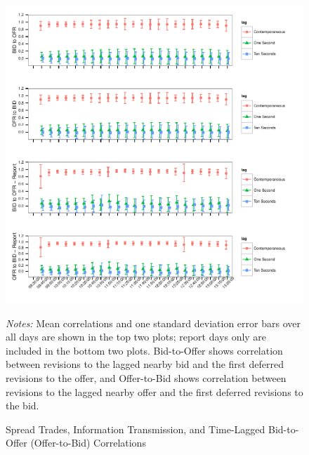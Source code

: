 \documentclass[review,12pt]{elsarticle}
\begin{document}
\begin{figure}[htbp]
\includegraphics[scale=0.95]{TablesFigures_files/figure-latex/unnamed-chunk-6-1.pdf}
{\footnotesize  \emph{Notes:} Mean correlations and one standard deviation error bars over all days
are shown in the top two plots; report days only are included in the
bottom two plots. Bid-to-Offer shows correlation between revisions to
the lagged nearby bid and the first deferred revisions to the offer, and
Offer-to-Bid shows correlation between revisions to the lagged nearby
offer and the first deferred revisions to the bid. \par}
\caption{Spread Trades, Information Transmission, and Time-Lagged
Bid-to-Offer (Offer-to-Bid) Correlations}
\end{figure}
\end{document}
